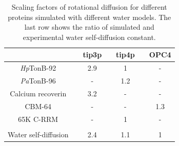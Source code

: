 \documentclass[journal=jpcbfk]{achemso}
\begin{document}
\newpage

\begin{table}[!h]
  \centering
  \caption{Scaling factors of rotational diffusion for different proteins simulated with different water models.
    The last row shows the ratio of simulated and experimental water self-diffusion constant.  }\label{ROTdiffCOEFFSscaled}
  \begin{tabular}{c c c c c c c}
                                       &    & tip3p &  & tip4p && OPC4  \\
    \hline
    {\it Hp}TonB-92                    &    & 2.9   &  & 1     && -\\
    {\it Pa}TonB-96                    &    &  -    &  & 1.2   && -\\
    Calcium recoverin \cite{timr18}    &    &  3.2  &  & -     && -\\
    CBM-64 \cite{heikkinen18}          &    &  -    &  & -     && 1.3 \\
    65K C-RRM \cite{norppa18}          &    & -     &  & 1     && - \\
    &&&&&& \\
    Water self-diffusion \cite{izadi14} &    & 2.4   & & 1.1   &&  1 \\
  \end{tabular}
\end{table}


\end{document}
